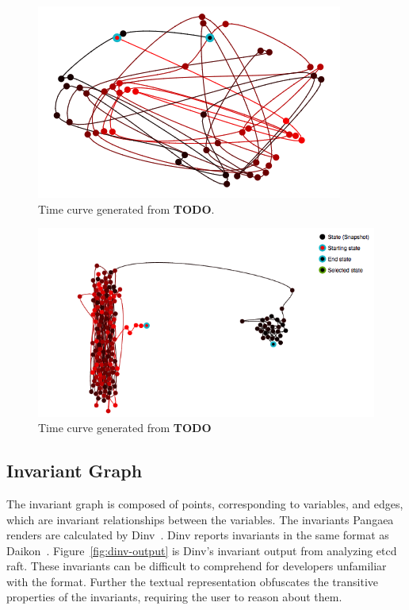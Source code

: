 \begin{figure}[h]
    \includegraphics[width=\linewidth]{fig/linear-server}%
    \caption{Time curve generated from \textbf{TODO}. \label{fig:linear-server}}%
\end{figure}

\begin{figure}[h]
    \includegraphics[width=\linewidth]{fig/put-get-fail}%
    \caption{Time curve generated from \textbf{TODO} \label{fig:put-get-fail}}%
\end{figure}

\subsection{Invariant Graph}
\label{sec:invariant-graph}

The invariant graph is composed of points, corresponding to variables,
and edges, which are invariant relationships between the variables.
The invariants Pangaea renders are calculated by Dinv~\cite{dinv}.
Dinv reports invariants in the same format as Daikon~\cite{Ernst01}.
Figure~\ref{fig:dinv-output} is Dinv's invariant output from analyzing
etcd raft. These invariants can be difficult to comprehend for
developers unfamiliar with the format. Further the textual representation
obfuscates the transitive properties of the invariants, requiring the
user to reason about them.

